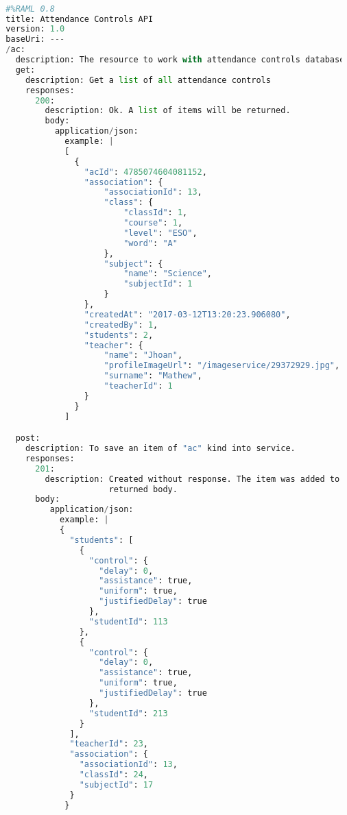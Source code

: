 \begin{lstlisting}[language=python,frame=none]

  #%RAML 0.8
  title: Attendance Controls API
  version: 1.0
  baseUri: ---
  /ac:
    description: The resource to work with attendance controls database saved.
    get:
      description: Get a list of all attendance controls
      responses:
        200:
          description: Ok. A list of items will be returned.
          body:
            application/json:
              example: |
              [
                {
                  "acId": 4785074604081152,
                  "association": {
                      "associationId": 13,
                      "class": {
                          "classId": 1,
                          "course": 1,
                          "level": "ESO",
                          "word": "A"
                      },
                      "subject": {
                          "name": "Science",
                          "subjectId": 1
                      }
                  },
                  "createdAt": "2017-03-12T13:20:23.906080",
                  "createdBy": 1,
                  "students": 2,
                  "teacher": {
                      "name": "Jhoan",
                      "profileImageUrl": "/imageservice/29372929.jpg",
                      "surname": "Mathew",
                      "teacherId": 1
                  }
                }
              ]

    post:
      description: To save an item of "ac" kind into service.
      responses:
        201:
          description: Created without response. The item was added to database will not
                       returned body.
        body:
           application/json:
             example: |
             {
               "students": [
                 {
                   "control": {
                     "delay": 0,
                     "assistance": true,
                     "uniform": true,
                     "justifiedDelay": true
                   },
                   "studentId": 113
                 },
                 {
                   "control": {
                     "delay": 0,
                     "assistance": true,
                     "uniform": true,
                     "justifiedDelay": true
                   },
                   "studentId": 213
                 }
               ],
               "teacherId": 23,
               "association": {
                 "associationId": 13,
                 "classId": 24,
                 "subjectId": 17
               }
              }


\end{lstlisting}
